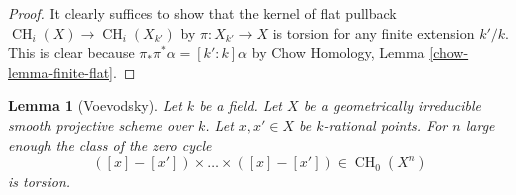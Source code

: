 \documentclass{stacks-project}
\newenvironment{reference}{\comment}{\endcomment}
\theoremstyle{plain}
\newtheorem{lemma}[subsection]{Lemma}
\theoremstyle{definition}
\theoremstyle{remark}
\numberwithin{equation}{subsection}
\def\CH{\mathop{\mathrm{CH}}\nolimits}
\begin{document}
\begin{proof}
It clearly suffices to show that the kernel
of flat pullback $\CH_i(X) \to \CH_i(X_{k'})$
by $\pi : X_{k'} \to X$ is torsion
for any finite extension $k'/k$. This is clear because
$\pi_* \pi^* \alpha = [k' : k] \alpha$ by
Chow Homology, Lemma \ref{chow-lemma-finite-flat}.
\end{proof}

\begin{lemma}[Voevodsky]
\label{lemma-smash-nilpotence}
\begin{reference}
\cite{nilpotence}
\end{reference}
Let $k$ be a field. Let $X$ be a geometrically irreducible
smooth projective scheme over $k$. Let $x, x' \in X$ be $k$-rational points.
For $n$ large enough the class of the zero cycle
$$
([x] - [x']) \times \ldots \times ([x] - [x']) \in
\CH_0(X^n)
$$
is torsion.
\end{lemma}
\end{document}
